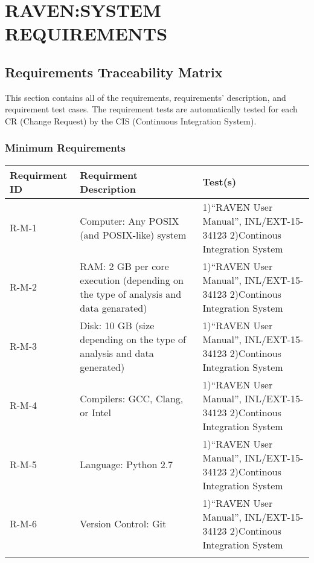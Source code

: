 \section{RAVEN:SYSTEM REQUIREMENTS} 
 \subsection{Requirements Traceability Matrix} 
 This section contains all of the requirements, requirements' description, and 
 requirement test cases. The requirement tests are automatically tested for each 
 CR (Change Request) by the CIS (Continuous Integration System). 
 \newcolumntype{b}{X} 
 \subsubsection{Minimum Requirements} 
\begin{tabularx}{\textwidth}{|s|s|b|} 
\hline 
\textbf{Requirment ID} & \textbf{Requirment Description} & \textbf{Test(s)}  \\ \hline 
\hline 
 \hspace{0pt}R-M-1 & \hspace{0pt}Computer: Any POSIX (and POSIX-like) system & \hspace{0pt}1)``RAVEN User Manual'', INL/EXT-15-34123 2)Continous Integration System \\ \hline 
\hline 
 \hspace{0pt}R-M-2 & \hspace{0pt}RAM: 2 GB per core execution (depending on the type of analysis and data genarated) & \hspace{0pt}1)``RAVEN User Manual'', INL/EXT-15-34123 2)Continous Integration System \\ \hline 
\hline 
 \hspace{0pt}R-M-3 & \hspace{0pt}Disk: 10 GB (size depending on the type of analysis and data generated) & \hspace{0pt}1)``RAVEN User Manual'', INL/EXT-15-34123 2)Continous Integration System \\ \hline 
\hline 
 \hspace{0pt}R-M-4 & \hspace{0pt}Compilers: GCC, Clang, or Intel & \hspace{0pt}1)``RAVEN User Manual'', INL/EXT-15-34123 2)Continous Integration System \\ \hline 
\hline 
 \hspace{0pt}R-M-5 & \hspace{0pt}Language: Python 2.7 & \hspace{0pt}1)``RAVEN User Manual'', INL/EXT-15-34123 2)Continous Integration System \\ \hline 
\hline 
 \hspace{0pt}R-M-6 & \hspace{0pt}Version Control: Git & \hspace{0pt}1)``RAVEN User Manual'', INL/EXT-15-34123 2)Continous Integration System \\ \hline 
\hline 
\caption*{Minimum Requirements}
\end{tabularx} 
